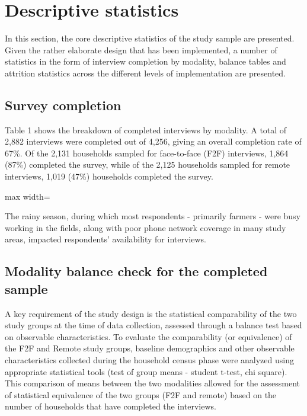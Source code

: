 \documentclass[11pt,harvard]{article}
\begin{document}
	
	\pagebreak
	
	
	\section{Descriptive statistics}
	
	In this section, the core descriptive statistics of the study sample are presented. Given the rather elaborate design that has been implemented, a number of statistics in the form of interview completion by modality, balance tables and attrition statistics across the different levels of implementation are presented.
	
	\subsection{Survey completion}
	
	Table 1 shows the breakdown of completed interviews by modality. A total of 2,882 interviews were completed out of 4,256, giving an overall completion rate of 67\%. Of the 2,131 households sampled for face-to-face (F2F) interviews, 1,864 (87\%) completed the survey, while of the 2,125 households sampled for remote interviews, 1,019 (47\%) households completed the survey.
	 
	\begin{table}[htbp]
		\centering
		\begin{adjustbox}{max width=\textwidth}
			\begin{threeparttable}
				\caption{Sample Completion: Face-to-Face vs. Remote}
				\scriptsize
				 
				\label{tab:BF_rCARI_Completion}
			\end{threeparttable}
		\end{adjustbox}
	\end{table}
	
	The rainy season, during which most respondents - primarily farmers - were busy working in the fields, along with poor phone network coverage in many study areas, impacted respondents’ availability for interviews.
	
	
	\subsection{Modality balance check for the completed sample}

	A key requirement of the study design is the statistical comparability of the two study groups at the time of data collection, assessed through a balance test based on observable characteristics. To evaluate the comparability (or equivalence) of the F2F and Remote study groups, baseline demographics and other observable characteristics collected during the household census phase were analyzed using appropriate statistical tools (test of group means - student t-test, chi square). This comparison of means between the two modalities allowed for the assessment of statistical equivalence of the two groups (F2F and remote) based on the number of households that have completed the interviews. 
	
\end{document}
